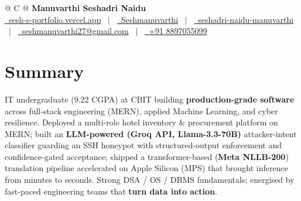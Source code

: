 \documentclass[a4paper,10.5pt]{article}
\begin{document}
\pagestyle{empty}

\begin{tabularx}{\linewidth}{@{} C @{}}
{\Huge \textbf{Manuvarthi Seshadri Naidu}} \\[5pt]
\href{https://sesh-s-portfolio.vercel.app}{\raisebox{-0.05\height}\faGlobe\ sesh-s-portfolio.vercel.app} \ $|$ \
\href{https://github.com/Seshmanuvarthi}{\raisebox{-0.05\height}\faGithub\ Seshmanuvarthi} \ $|$ \
\href{https://www.linkedin.com/in/seshadri-naidu-manuvarthi-366466295/}{\raisebox{-0.05\height}\faLinkedin\ seshadri-naidu-manuvarthi} \ $|$ \
\href{mailto:seshmanuvarthi27@gmail.com}{\raisebox{-0.05\height}\faEnvelope\ seshmanuvarthi27@gmail.com} \ $|$ \
\href{tel:+918897055099}{\raisebox{-0.05\height}\faMobile\ +91 8897055099} \\
\end{tabularx}

\section{Summary}
\vspace{1pt}
IT undergraduate (9.22 CGPA) at CBIT building \textbf{production-grade software} across full-stack engineering (MERN), applied Machine Learning, and cyber resilience. Deployed a multi-role hotel inventory \& procurement platform on MERN; built an \textbf{LLM-powered (Groq API, Llama-3.3-70B)} attacker-intent classifier guarding an SSH honeypot with structured-output enforcement and confidence-gated acceptance; shipped a transformer-based (\textbf{Meta NLLB-200}) translation pipeline accelerated on Apple Silicon (MPS) that brought inference from minutes to seconds. Strong DSA / OS / DBMS fundamentals; energised by fast-paced engineering teams that \textbf{turn data into action}.

\end{document}
